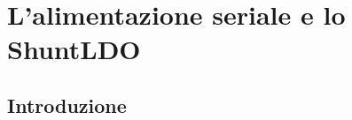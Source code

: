 \chapter{L'alimentazione seriale e lo ShuntLDO}
\label{AlimentazioneSeriale}
\section{Introduzione}

